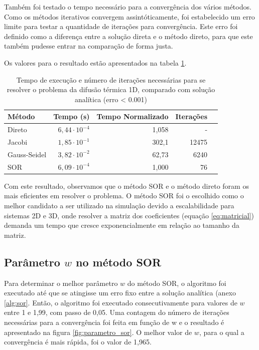 Também foi testado o tempo necessário para a convergência dos vários métodos. Como os métodos iterativos convergem assintóticamente, foi estabelecido um erro limite para testar a quantidade de iterações para convergência. Este erro foi definido como a diferença entre a solução direta e o método direto, para que este também pudesse entrar na comparação de forma justa. 

Os valores para o resultado estão apresentados na tabela \ref{tab:tempo_metodos}. 

\begin{table}[htbp]
    \caption{Tempo de execução e número de iterações necessárias para se resolver o problema da difusão térmica 1D, comparado com solução analítica (erro < 0.001) }
    \label{tab:tempo_metodos}
    \vspace{1em}
    \centering
    \begin{tabular}{l r r r r}
        \toprule
        Método  	        & Tempo (s)             & Tempo Normalizado & Iterações     	\\
        \midrule
        Direto   	        & $6,44 \cdot 10^{-4}$  & 1,058	            & - 		        \\
        Jacobi	            & $1,85 \cdot 10^{-1}$  & 302,1             & 12475             \\
        Gauss-Seidel   	    & $3,82 \cdot 10^{-2}$	& 62,73		        &  6240		        \\
        SOR            	    & $6,09 \cdot 10^{-4}$	& 1,000		        &    76		        \\
        \bottomrule
    \end{tabular}
\end{table}

Com este resultado, observamos que o método SOR e o método direto foram os mais eficientes em resolver o problema. O método SOR foi o escolhido como o melhor candidato a ser utilizado na simulação devido a escalabilidade para sistemas 2D e 3D, onde resolver a matriz dos coeficientes (equação \ref{eq:matricial}) demanda um tempo que cresce exponencialmente em relação ao tamanho da matriz.  

\subsection{Parâmetro $w$ no método SOR}

Para determinar o melhor parâmetro $w$ do método SOR, o algoritmo foi executado até que se atingisse um erro fixo entre a solução analítica (anexo \ref{alg:sor}. Então, o algoritmo foi executado consecutivamente para valores de $w$ entre 1 e 1,99, com passo de 0,05. Uma contagem do número de iterações necessárias para a convergência foi feita em função de w e o resultado é apresentado na figura \ref{fig:parametro_sor}. O melhor valor de $w$, para o qual a convergência é mais rápida, foi o valor de 1,965.

